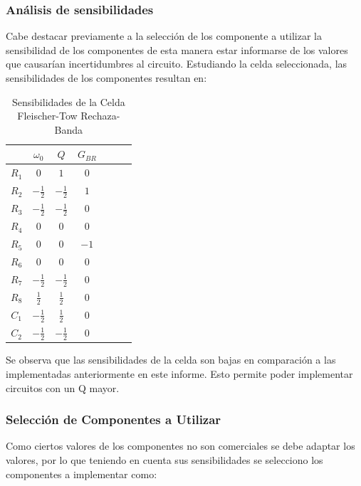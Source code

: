 \subsubsection{Análisis de sensibilidades}

Cabe destacar previamente a la selección de los componente a utilizar la sensibilidad de los componentes de esta manera estar informarse de los valores que causarían incertidumbres al circuito. Estudiando la celda seleccionada, las sensibilidades de los componentes resultan en:

\begin{table}[H]
	\centering
	\begin{tabular}{c c c c c c c}
		& $\omega_0$ & $Q$ & $G_{BR}$\\
		\hline  
		$R_1$ & $0$ & $1$ & $0$\\ 
		$R_2$ & $-\frac{1}{2}$ & $-\frac{1}{2}$ & $1$\\ 
		$R_3$ & $-\frac{1}{2}$ & $-\frac{1}{2}$ & $0$\\ 
		$R_4$ & $0$ & $0$ & $0$\\ 
		$R_5$ & $0$ & $0$  & $-1$\\ 
		$R_6$ & $0$ & $0$ & $0$\\ 
		$R_7$ & $-\frac{1}{2}$ & $-\frac{1}{2}$ & $0$\\ 
		$R_8$ & $\frac{1}{2}$ & $\frac{1}{2}$ & $0$\\ 
		$C_1$ & $-\frac{1}{2}$ & $\frac{1}{2}$  & $0$\\ 
		$C_2$ & $-\frac{1}{2}$ & $-\frac{1}{2}$ &$0$\\ 
		\hline
	\end{tabular}
	\caption{Sensibilidades de la Celda Fleischer-Tow Rechaza-Banda}
	\label{ej4sens}
\end{table}

Se observa que las sensibilidades de la celda son bajas en comparación a las implementadas anteriormente en este informe. Esto permite poder implementar circuitos con un Q mayor. 

\subsubsection{Selección de Componentes a Utilizar}

Como ciertos valores de los componentes no son comerciales se debe adaptar los valores, por lo que teniendo en cuenta sus sensibilidades se selecciono los componentes a implementar como:

